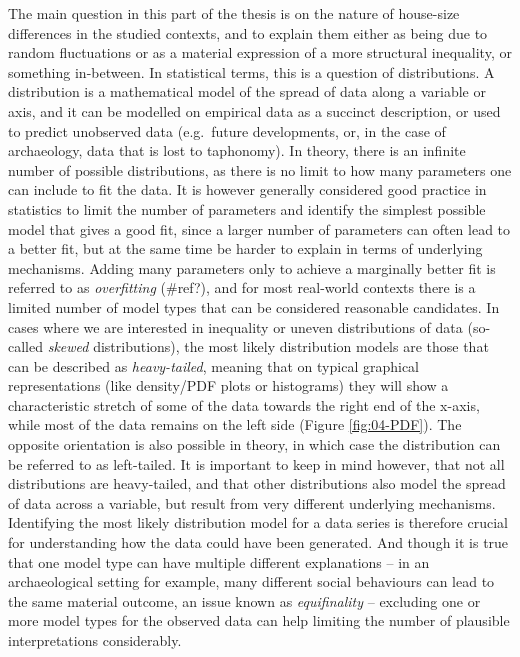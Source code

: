 \documentclass[
  12pt,
]{book}
\begin{document}
The main question in this part of the thesis is on the nature of house-size differences in the studied contexts, and to explain them either as being due to random fluctuations or as a material expression of a more structural inequality, or something in-between. In statistical terms, this is a question of distributions. A distribution is a mathematical model of the spread of data along a variable or axis, and it can be modelled on empirical data as a succinct description, or used to predict unobserved data (e.g.~future developments, or, in the case of archaeology, data that is lost to taphonomy). In theory, there is an infinite number of possible distributions, as there is no limit to how many parameters one can include to fit the data. It is however generally considered good practice in statistics to limit the number of parameters and identify the simplest possible model that gives a good fit, since a larger number of parameters can often lead to a better fit, but at the same time be harder to explain in terms of underlying mechanisms. Adding many parameters only to achieve a marginally better fit is referred to as \emph{overfitting} (\#ref?), and for most real-world contexts there is a limited number of model types that can be considered reasonable candidates. In cases where we are interested in inequality or uneven distributions of data (so-called \emph{skewed} distributions), the most likely distribution models are those that can be described as \emph{heavy-tailed}, meaning that on typical graphical representations (like density/PDF plots or histograms) they will show a characteristic stretch of some of the data towards the right end of the x-axis, while most of the data remains on the left side (Figure \ref{fig:04-PDF}). The opposite orientation is also possible in theory, in which case the distribution can be referred to as left-tailed. It is important to keep in mind however, that not all distributions are heavy-tailed, and that other distributions also model the spread of data across a variable, but result from very different underlying mechanisms. Identifying the most likely distribution model for a data series is therefore crucial for understanding how the data could have been generated. And though it is true that one model type can have multiple different explanations -- in an archaeological setting for example, many different social behaviours can lead to the same material outcome, an issue known as \emph{equifinality} -- excluding one or more model types for the observed data can help limiting the number of plausible interpretations considerably.
\end{document}
